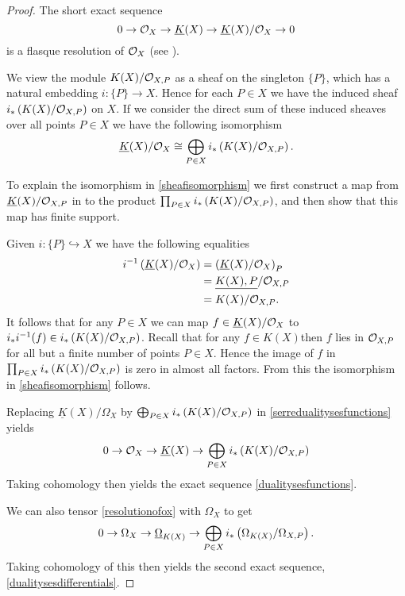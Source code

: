     \begin{proof}
    The short exact sequence
        \begin{equation}\label{serredualitysesfunctions}
        0 \rightarrow {\cal O}_X \rightarrow \underline{K}(X) \rightarrow \underline{K}(X)/{\cal O}_X \rightarrow 0
        \end{equation}
    is a flasque resolution of ${\cal O}_X$ (see \cite[Chap. II, ex. 1.16]{hart}).
    
    We view the module $K(X)/{\cal O}_{X,P}$ as a sheaf on the singleton $\{P\}$, which has a natural embedding $i\colon \{P\} \rightarrow X$.
    Hence for each $P\in X$ we have the induced sheaf $i_*\left( K(X)/{\cal O}_{X,P} \right)$ on $X$.
    If we consider the direct sum of these induced sheaves over all points $P\in X$ we have the following isomorphism
        \begin{equation}\label{sheafisomorphism}
        \underline{K}(X)/{\cal O}_X\cong \bigoplus_{P\in X} i_*\left(K(X)/{\cal O}_{X,P}\right).
        \end{equation}
    
    
    To explain the isomorphism in \eqref{sheafisomorphism} we first construct a map from $\underline{K}(X)/{\cal O}_{X,P}$ in to the product $\prod_{P \in X} i_*\left({K(X)}/{\cal O}_{X,P}\right)$, and then show that this map has finite support.
    
    Given $i\colon \{P\} \hookrightarrow X$ we have the following equalities
        \begin{align*}
        i^{-1}\left(\underline{K}(X)/{\cal O}_X\right) & = \left(\underline{K}(X)/{\cal O}_X\right)_P \\
        & = \underline{K(X),P}/{\cal O}_{X,P} \\
        & = K(X)/{\cal O}_{X,P}.
        \end{align*}
    It follows that for any $P \in X$ we can map $f \in \underline{K}(X)/{\cal O}_X$ to $i_*i^{-1}(f) \in i_* \left( K(X)/{\cal O}_{X,P} \right)$.
    Recall that for any $f \in K(X)$then $f$ lies in ${\cal O}_{X,P}$ for all but a finite number of points $P \in X$.
    Hence the image of $f$ in $\prod_{P \in X} i_*\left(K(X)/{\cal O}_{X,P}\right)$ is zero in almost all factors.
    From this the isomorphism in \eqref{sheafisomorphism} follows.
    
    Replacing $\underline{K}(X)/\Omega_X$ by $\bigoplus_{P\in X} i_*\left(K(X)/{\cal O}_{X,P}\right)$ in \eqref{serredualitysesfunctions} yields
        \begin{equation}\label{resolutionofox}
        0 \rightarrow {\cal O}_X \rightarrow \underline{K}(X) \rightarrow \bigoplus_{P \in X}i_* \left( K(X)/{\cal O}_{X,P} \right)
        \end{equation}
    Taking cohomology then yields the exact sequence \eqref{dualitysesfunctions}.
    
    We can also tensor \eqref{resolutionofox} with $\Omega_X$ to get
        \begin{equation}\label{serredualitydifferentials}
        0 \rightarrow \Omega_X \rightarrow \underline{\Omega}_{K(X)} \rightarrow \bigoplus_{P \in X} i_* \left( \Omega_{K(X)}/\Omega_{X,P} \right).
        \end{equation}
    Taking cohomology of this then yields the second exact sequence, \eqref{dualitysesdifferentials}.
    \end{proof}

